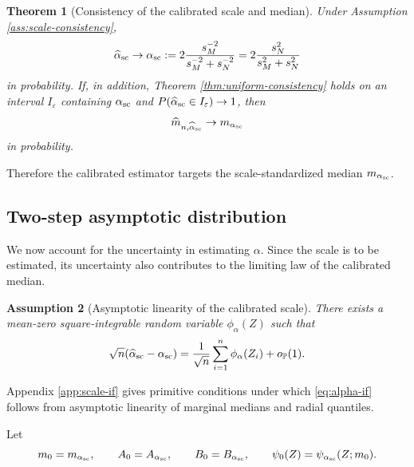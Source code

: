 \documentclass[11pt]{article}
\newtheorem{theorem}{Theorem}
\newtheorem{assumption}[theorem]{Assumption}
\newcommand{\Pbb}{\mathbb P}
\newcommand{\eps}{\varepsilon}
\newcommand{\1}{\mathbf{1}}
\begin{document}
\begin{theorem}[Consistency of the calibrated scale and median]\label{thm:calibration-consistency}
Under Assumption \ref{ass:scale-consistency},
\begin{equation}\label{eq:alpha-sc-limit}
 \widehat\alpha_{\rm sc}\to
 \alpha_{\rm sc}:=2\frac{s_M^{-2}}{s_M^{-2}+s_N^{-2}}
 =2\frac{s_N^2}{s_M^2+s_N^2}
\end{equation}
in probability.  If, in addition, Theorem \ref{thm:uniform-consistency} holds on an interval $I_\eps$ containing $\alpha_{\rm sc}$ and $P(\widehat\alpha_{\rm sc}\in I_\eps)\to1$, then
\[
 \widehat m_{n,\widehat\alpha_{\rm sc}}\to m_{\alpha_{\rm sc}}
\]
in probability.
\end{theorem}
Therefore the calibrated estimator targets the scale-standardized median
$m_{\alpha_{\rm sc}}$.

\subsection{Two-step asymptotic distribution}


We now account for the uncertainty in estimating $\alpha$. Since the scale is to be estimated, its uncertainty also contributes to the limiting law of the calibrated median.

\begin{assumption}[Asymptotic linearity of the calibrated scale]\label{ass:alpha-if}
There exists a mean-zero square-integrable random variable $\phi_\alpha(Z)$ such that
\begin{equation}\label{eq:alpha-if}
 \sqrt n(\widehat\alpha_{\rm sc}-\alpha_{\rm sc})
 =\frac1{\sqrt n}\sum_{i=1}^n\phi_\alpha(Z_i)+o_{\Pbb}(1).
\end{equation}
\end{assumption}

Appendix \ref{app:scale-if} gives primitive conditions under which \eqref{eq:alpha-if} follows from asymptotic linearity of marginal medians and radial quantiles.

Let
\[
 m_0=m_{\alpha_{\rm sc}},
 \qquad
 A_0=A_{\alpha_{\rm sc}},
 \qquad
 B_0=B_{\alpha_{\rm sc}},
 \qquad
 \psi_0(Z)=\psi_{\alpha_{\rm sc}}(Z;m_0).
\]
\end{document}
